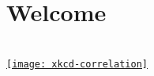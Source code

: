 \documentclass[t]{beamer}
\begin{document}

%
%
%


  \section{Welcome}

  \begin{frame}[t, plain]

    \vspace{.1\paperwidth}

    \begin{center}
      {%
      \Large {}}\\[.1\paperwidth]

      \href{http://xkcd.com/552/}{\texttt{[image: xkcd-correlation]}%
      }
    \end{center}

  \end{frame}
\end{document}
